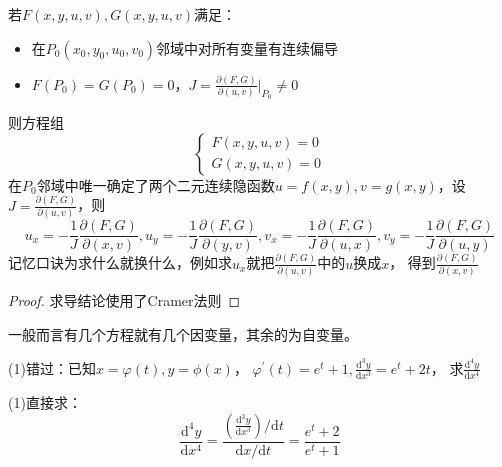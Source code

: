 \begin{theorem}[隐函数组定理]
  若$F(x,y,u,v), G(x,y,u,v)$满足：
  \begin{itemize}
  \item 在$P_0(x_0,y_0,u_0,v_0)$邻域中对所有变量有连续偏导
  \item $F(P_0) = G(P_0) = 0$，$J = \frac{\partial(F,G)}{\partial(u,v)}\bigg|_{P_0} \neq 0$
  \end{itemize}
  则方程组
  \begin{equation*}
    \begin{cases}
      F(x,y,u,v) = 0\\
      G(x,y,u,v) = 0
    \end{cases}
  \end{equation*}
  在$P_0$邻域中唯一确定了两个二元连续隐函数$u = f(x,y), v = g(x,y)$，设$J = \frac{\partial(F,G)}{\partial(u,v)}$，则
  \begin{equation*}
    u_x = - \frac{1}{J} \frac{\partial(F,G)}{\partial(x,v)}, u_y = - \frac{1}{J} \frac{\partial(F,G)}{\partial(y,v)}, v_x = - \frac{1}{J} \frac{\partial(F,G)}{\partial(u,x)}, v_y = - \frac{1}{J} \frac{\partial(F,G)}{\partial(u,y)}
  \end{equation*}
  记忆口诀为求什么就换什么，例如求$u_x$就把$\frac{\partial(F,G)}{\partial(u,v)}$中的$u$换成$x$，
  得到$\frac{\partial(F,G)}{\partial(x,v)}$
\end{theorem}

\begin{proof}
  求导结论使用了Cramer法则
\end{proof}

\begin{note}
  一般而言有几个方程就有几个因变量，其余的为自变量。
\end{note}

\begin{exercise}[容易分不清的题]
  (1)错过：已知$x = \varphi(t), y = \phi(x)$，
  $\varphi^{\prime}(t) = e^t + 1, \frac{\mathrm{d} ^3y}{\mathrm{d}x^3} = e^t + 2t$，
  求$\frac{\mathrm{d} ^4y}{\mathrm{d} x^4}$
\end{exercise}

\begin{solution}
  (1)直接求：
  \begin{equation*}
    \frac{\mathrm{d}^4y}{\mathrm{d} x^4} = \frac{\left( \frac{\mathrm{d}^3y}{\mathrm{d}x^3} \right)/ \mathrm{d} t}{\mathrm{d} x /\mathrm{d} t} = \frac{e^t + 2}{e^t + 1}
  \end{equation*}
\end{solution}

